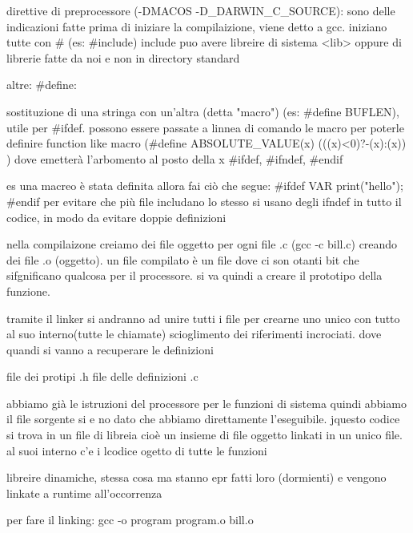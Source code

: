 direttive di preprocessore (-DMACOS -D_DARWIN_C_SOURCE): sono delle indicazioni fatte prima di iniziare la compilaizione, viene detto a gcc. iniziano tutte con # (es: #include) include puo avere libreire di sistema <lib> oppure di librerie fatte da noi e non in directory standard

altre:
#define:

sostituzione di una stringa con un'altra (detta "macro") (es: #define BUFLEN), utile per #ifdef. possono essere passate a linnea di comando le macro per poterle definire
function like macro (#define ABSOLUTE_VALUE(x) (((x)<0)?-(x):(x)) ) dove emetterà l'arbomento al posto della x
#ifdef, #ifndef, #endif

es una macreo è stata definita allora fai ciò che segue:
#ifdef VAR
print("hello");
#endif
per evitare che più file includano lo stesso si usano degli ifndef in tutto il codice, in modo da evitare doppie definizioni

nella compilaizone creiamo dei file oggetto per ogni file .c (gcc -c bill.c) creando dei file .o (oggetto). un file compilato è un file dove ci son otanti bit che sifgnificano qualcosa per il processore. si va quindi a creare il prototipo della funzione.

tramite il linker si andranno ad unire tutti i file per crearne uno unico con tutto al suo interno(tutte le chiamate) scioglimento dei riferimenti incrociati. dove quandi si vanno a recuperare le definizioni

file dei protipi .h
file delle definizioni .c

abbiamo già le istruzioni del processore per le funzioni di sistema quindi abbiamo il file sorgente si e no dato che abbiamo direttamente l'eseguibile. jquesto codice si trova in un file di libreia cioè un insieme di file oggetto linkati in un unico file. al suoi interno c'e i lcodice ogetto di tutte le funzioni

libreire dinamiche, stessa cosa ma stanno epr fatti loro (dormienti) e vengono linkate a runtime all'occorrenza

per fare il linking:
gcc -o program program.o bill.o